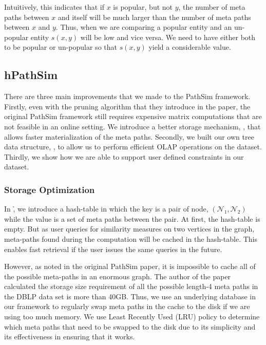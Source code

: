 Intuitively, this indicates that if $x$ is popular, but not $y$, the number of
meta paths between $x$ and itself will be much larger than the number of
meta paths between $x$ and $y$. Thus, when we are comparing a popular entity
and an un-popular entity $s(x,y)$ will be low and vice versa. We need to have
either both to be popular or un-popular so that $s(x,y)$ yield a considerable
value.

\subsection{hPathSim}

There are three main improvements that we made to the PathSim framework.
Firstly, even with the pruning algorithm that they introduce in the paper,
the original PathSim framework still requires expensive matrix computations
that are not feasible in an online setting. We introduce a better storage
mechanism, \mTable, that allows faster materialization of the meta paths. Secondly,
we built our own tree data structure, \hTable, to allow us to perform
efficient OLAP operations on the dataset. Thirdly, we show how we are able
to support user defined constraints in our dataset.


\subsubsection{Storage Optimization}

In \h, we introduce a hash-table in which the key is a pair of node,
$(\mathcal{N}_1, \mathcal{N}_2)$ while the value is a set of meta paths between
the pair.  At first, the hash-table is empty. But as user queries for
similarity measures on two vertices in the graph, meta-paths found during the
computation will be cached in the hash-table. This enables fast retrieval if
the user issues the same queries in the future.

However, as noted in the original PathSim paper, it is impossible to cache all
of the possible meta-paths in an enormous graph. The author of the paper
calculated the storage size requirement of all the possible length-4 meta paths
in the DBLP data set is more than 40GB. Thus, we use an underlying database in
our framework to regularly swap meta paths in the cache to the disk if we are
using too much memory. We use Least Recently Used (LRU) policy to determine
which meta paths that need to be swapped to the disk due to its simplicity and
its effectiveness in ensuring that it works.

